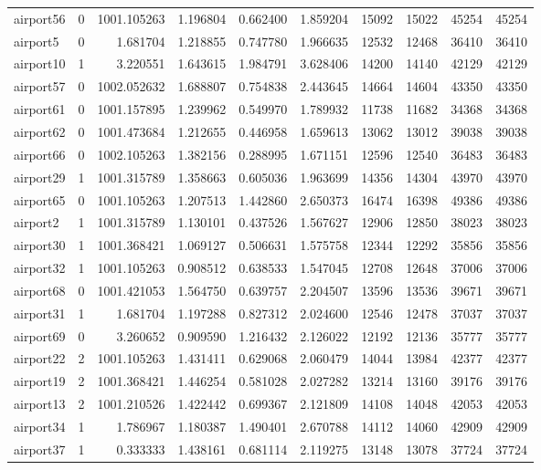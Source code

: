 \begin{longtable}{|l|r|r|r|r|r|r|r|r|r|}
airport56 & 0 & 1001.105263 & 1.196804 & 0.662400 & 1.859204 & 15092 & 15022 & 45254 & 45254 \\
airport5 & 0 & 1.681704 & 1.218855 & 0.747780 & 1.966635 & 12532 & 12468 & 36410 & 36410 \\
airport10 & 1 & 3.220551 & 1.643615 & 1.984791 & 3.628406 & 14200 & 14140 & 42129 & 42129 \\
airport57 & 0 & 1002.052632 & 1.688807 & 0.754838 & 2.443645 & 14664 & 14604 & 43350 & 43350 \\
airport61 & 0 & 1001.157895 & 1.239962 & 0.549970 & 1.789932 & 11738 & 11682 & 34368 & 34368 \\
airport62 & 0 & 1001.473684 & 1.212655 & 0.446958 & 1.659613 & 13062 & 13012 & 39038 & 39038 \\
airport66 & 0 & 1002.105263 & 1.382156 & 0.288995 & 1.671151 & 12596 & 12540 & 36483 & 36483 \\
airport29 & 1 & 1001.315789 & 1.358663 & 0.605036 & 1.963699 & 14356 & 14304 & 43970 & 43970 \\
airport65 & 0 & 1001.105263 & 1.207513 & 1.442860 & 2.650373 & 16474 & 16398 & 49386 & 49386 \\
airport2 & 1 & 1001.315789 & 1.130101 & 0.437526 & 1.567627 & 12906 & 12850 & 38023 & 38023 \\
airport30 & 1 & 1001.368421 & 1.069127 & 0.506631 & 1.575758 & 12344 & 12292 & 35856 & 35856 \\
airport32 & 1 & 1001.105263 & 0.908512 & 0.638533 & 1.547045 & 12708 & 12648 & 37006 & 37006 \\
airport68 & 0 & 1001.421053 & 1.564750 & 0.639757 & 2.204507 & 13596 & 13536 & 39671 & 39671 \\
airport31 & 1 & 1.681704 & 1.197288 & 0.827312 & 2.024600 & 12546 & 12478 & 37037 & 37037 \\
airport69 & 0 & 3.260652 & 0.909590 & 1.216432 & 2.126022 & 12192 & 12136 & 35777 & 35777 \\
airport22 & 2 & 1001.105263 & 1.431411 & 0.629068 & 2.060479 & 14044 & 13984 & 42377 & 42377 \\
airport19 & 2 & 1001.368421 & 1.446254 & 0.581028 & 2.027282 & 13214 & 13160 & 39176 & 39176 \\
airport13 & 2 & 1001.210526 & 1.422442 & 0.699367 & 2.121809 & 14108 & 14048 & 42053 & 42053 \\
airport34 & 1 & 1.786967 & 1.180387 & 1.490401 & 2.670788 & 14112 & 14060 & 42909 & 42909 \\
airport37 & 1 & 0.333333 & 1.438161 & 0.681114 & 2.119275 & 13148 & 13078 & 37724 & 37724 \\

\end{longtable}
